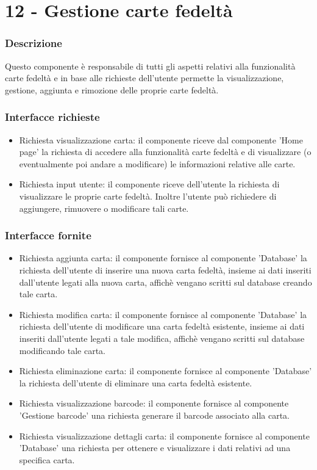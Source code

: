 \documentclass[a4paper,12pt]{article}
\begin{document}
\section*{12 -  Gestione carte fedeltà}
\subsubsection*{Descrizione}
Questo componente è responsabile di tutti gli aspetti relativi alla funzionalità carte fedeltà e in base alle richieste dell'utente permette la visualizzazione, gestione, aggiunta e rimozione delle proprie carte fedeltà.
\subsubsection*{Interfacce richieste}
\begin{itemize} \setlength\itemsep{0.01em}
\item {\sffamily Richiesta visualizzazione carta}: il componente riceve dal componente 'Home page'  la richiesta di accedere alla funzionalità carte fedeltà e di visualizzare (o eventualmente poi andare a modificare) le informazioni relative alle carte.
\item {\sffamily Richiesta input utente}: il componente riceve dell'utente la richiesta di visualizzare le proprie carte fedeltà. Inoltre l'utente può richiedere di aggiungere, rimuovere o modificare tali carte.

\end{itemize}

\subsubsection*{Interfacce fornite}
\begin{itemize} \setlength\itemsep{0.01em}
\item {\sffamily Richiesta aggiunta carta}: il componente fornisce al componente 'Database' la richiesta dell'utente di inserire una nuova carta fedeltà, insieme ai dati inseriti dall'utente legati alla nuova carta, affichè vengano scritti sul database creando tale carta.
\item {\sffamily Richiesta modifica carta}: il componente fornisce al componente 'Database'  la richiesta dell'utente di modificare una carta fedeltà esistente, insieme ai dati inseriti dall'utente legati a tale modifica, affichè vengano scritti sul database modificando tale carta.
\item {\sffamily Richiesta eliminazione carta}: il componente fornisce al componente 'Database'  la richiesta dell'utente di eliminare una carta fedeltà esistente.
\item {\sffamily Richiesta visualizzazione barcode}: il componente fornisce al componente 'Gestione barcode' una richiesta generare il barcode associato alla carta.
\item {\sffamily Richiesta visualizzazione dettagli carta}: il componente fornisce al componente 'Database' una richiesta per ottenere e visualizzare i dati relativi ad una specifica carta.
\end{itemize}
\end{document}

